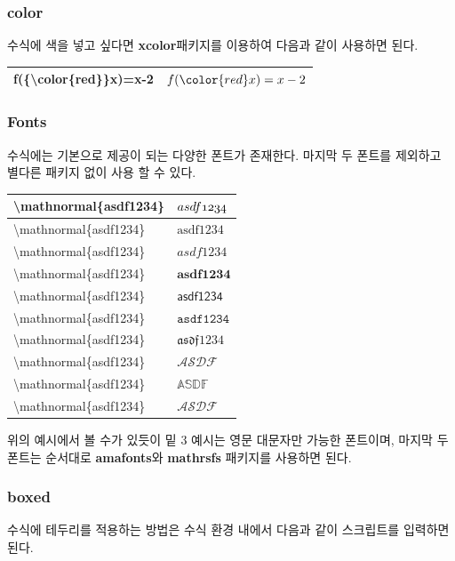 \documentclass[12pt]{article}
\begin{document}
	\subsubsection{color}
	수식에 색을 넣고 싶다면 \textbf{xcolor}패키지를 이용하여 다음과 같이 사용하면 된다.\newline
	
	\begin{tabularx}{\textwidth\onehalfspacing}{|X|X|}
		\hline
		f(\{\textbackslash color\{red\}\}x)=x-2&\(f({\color{red}x})=x-2\)\\
		\hline
	\end{tabularx}
	\subsubsection{Fonts}
	수식에는 기본으로 제공이 되는 다양한 폰트가 존재한다. 마지막 두 폰트를 제외하고 별다른 패키지 없이 사용 할 수 있다.\newline
	
	\begin{tabularx}{\textwidth\onehalfspacing}{|X|X|}
		\hline
		\textbackslash mathnormal\{asdf1234\}&\(\mathnormal{asdf1234}\)\\
		\hline
		\textbackslash mathnormal\{asdf1234\}&\(\mathrm{asdf1234}\)\\
		\hline
		\textbackslash mathnormal\{asdf1234\}&\(\mathit{asdf1234}\)\\
		\hline
		\textbackslash mathnormal\{asdf1234\}&\(\mathbf{asdf1234}\)\\
		\hline
		\textbackslash mathnormal\{asdf1234\}&\(\mathsf{asdf1234}\)\\
		\hline
		\textbackslash mathnormal\{asdf1234\}&\(\mathtt{asdf1234}\)\\
		\hline
		\textbackslash mathnormal\{asdf1234\}&\(\mathfrak{asdf1234}\)\\
		\hline
		\textbackslash mathnormal\{asdf1234\}&\(\mathcal{ASDF}\)\\
		\hline
		\textbackslash mathnormal\{asdf1234\}&\(\mathbb{ASDF}\)\\
		\hline
		\textbackslash mathnormal\{asdf1234\}&\(\mathscr{ASDF}\)\\
		\hline
	\end{tabularx}\newline\newline
	위의 예시에서 볼 수가 있듯이 밑 3 예시는 영문 대문자만 가능한 폰트이며, 마지막 두 폰트는 순서대로 \textbf{amafonts}와 \textbf{mathrsfs} 패키지를 사용하면 된다.
	\subsubsection{boxed}
	수식에 테두리를 적용하는 방법은 수식 환경 내에서 다음과 같이 스크립트를 입력하면 된다.\newline
	
\end{document}
